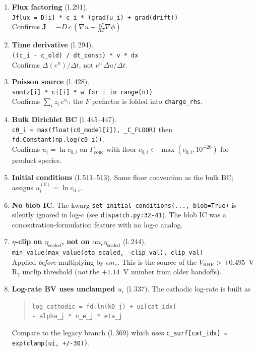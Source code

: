 \documentclass[11pt]{article}
\newcommand{\Gconc}{\Gamma_{\mathrm{conc}}}
\begin{document}
\begin{enumerate}\setlength\itemsep{4pt}
  \item \textbf{Flux factoring} (l.\,291). \\
        \verb|Jflux = D[i] * c_i * (grad(u_i) + grad(drift))| \\
        Confirms $\mathbf J = -D\,c\,(\nabla u + \tfrac{zF}{RT}\nabla\phi)$.
  \item \textbf{Time derivative} (l.\,294). \\
        \verb|((c_i - c_old) / dt_const) * v * dx| \\
        Confirms $\Delta(e^u)/\Delta t$, not $e^u\,\Delta u/\Delta t$.
  \item \textbf{Poisson source} (l.\,428). \\
        \verb|sum(z[i] * ci[i] * w for i in range(n))| \\
        Confirms $\sum_i z_i\,e^{u_i}$; the $F$ prefactor is folded
        into \verb|charge_rhs|.
  \item \textbf{Bulk Dirichlet BC} (l.\,445--447). \\
        \verb|c0_i = max(float(c0_model[i]), _C_FLOOR)| then
        \verb|fd.Constant(np.log(c0_i))|. \\
        Confirms $u_i = \ln c_{0,i}$ on $\Gconc$ with floor
        $c_{0,i}\leftarrow\max(c_{0,i}, 10^{-20})$ for product species.
  \item \textbf{Initial conditions} (l.\,511--513). Same floor convention as
        the bulk BC; assigns $u_i^{(0)} = \ln c_{0,i}$.
  \item \textbf{No blob IC.} The kwarg
        \verb|set_initial_conditions(..., blob=True)| is silently ignored
        in log-c (see \verb|dispatch.py:32-41|). The blob IC was a
        concentration-formulation feature with no log-c analog.
  \item \textbf{$\eta$-clip on $\eta_{\mathrm{scaled}}$, not on
        $\alpha n_e \eta_{\mathrm{scaled}}$} (l.\,244). \\
        \verb|min_value(max_value(eta_scaled, -clip_val), clip_val)| \\
        Applied \emph{before} multiplying by $\alpha n_e$. This is the
        source of the $V_{\mathrm{RHE}} > +0.495$~V R$_2$ unclip
        threshold (\emph{not} the $+1.14$~V number from older handoffs).
  \item \textbf{Log-rate BV uses unclamped $u_i$} (l.\,337). The cathodic
        log-rate is built as
        \begin{quote}\small
          \verb|log_cathodic = fd.ln(k0_j) + ui[cat_idx]|\\
          \hspace*{2em}\verb|- alpha_j * n_e_j * eta_j|
        \end{quote}
        Compare to the legacy branch (l.\,369) which uses
        \verb|c_surf[cat_idx] = exp(clamp(ui, +/-30))|.
\end{enumerate}
\end{document}

